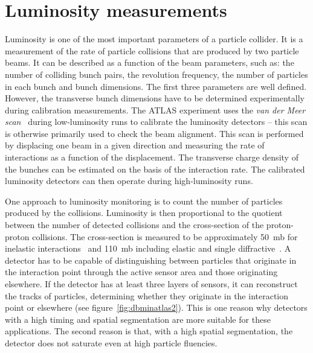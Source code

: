 \section{Luminosity measurements}
\label{sec:lumi}
Luminosity is one of the most important parameters of a particle collider. It is a measurement of the rate of particle collisions that are produced by two particle beams. It can be described as a function of the beam parameters, such as: the number of colliding bunch pairs, the revolution frequency, the number of particles in each bunch and bunch dimensions. The first three parameters are well defined. However, the transverse bunch dimensions have to be determined experimentally during calibration measurements. The ATLAS experiment uses the \emph{van der Meer scan}~\cite{ATLAS-CONF-2010-102} during low-luminosity runs to calibrate the luminosity detectors -- this scan is otherwise primarily used to check the beam alignment. This scan is performed by displacing one beam in a given direction and measuring the rate of interactions as a function of the displacement. The transverse charge density of the bunches can be estimated on the basis of the interaction rate. The calibrated luminosity detectors can then operate during high-luminosity runs.

One approach to luminosity monitoring is to count the number of particles produced by the collisions. Luminosity is then proportional to the quotient between the number of detected collisions and the cross-section of the proton-proton collisions. The cross-section is measured to be approximately 50~mb for inelastic interactions~\cite{Tompkins:1388995,0954-3899-38-12-124131} and 110~mb including elastic and single diffractive~\cite{ppcol:00000}. A detector has to be capable of distinguishing between particles that originate in the interaction point through the active sensor area and those originating elsewhere. If the detector has at least three layers of sensors, it can reconstruct the tracks of particles, determining whether they originate in the interaction point or elsewhere (see figure~\ref{fig:dbminatlas2}). This is one reason why detectors with a high timing and spatial segmentation are more suitable for these applications. The second reason is that, with a high spatial segmentation, the detector does not saturate even at high particle fluencies.



